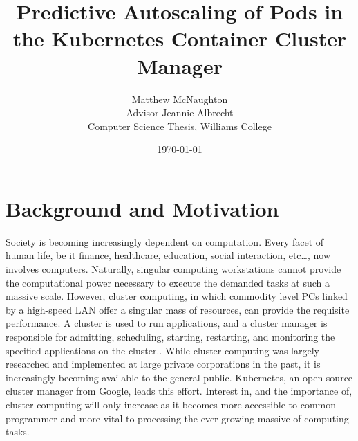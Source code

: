 \documentclass[letterpaper,11pt,twocolumn]{article}
\begin{document}
\title{Predictive Autoscaling of Pods in the Kubernetes Container Cluster
Manager}
\date{\today}

\author{
  {\rm Matthew McNaughton}\\
  Advisor Jeannie Albrecht\\
  Computer Science Thesis, Williams College
}

\maketitle

\thispagestyle{empty}

\section{Background and Motivation}
Society is becoming increasingly dependent on computation. Every facet of human
life, be it finance, healthcare, education, social interaction, etc\ldots, now
involves computers.\cite[pg. 4]{distributed-systems-concepts-and-design}
Naturally, singular computing workstations cannot provide the computational
power necessary to execute the demanded tasks at such a massive scale.\cite[pg.
2]{distributed-systems-principles-and-paradigms} However, cluster computing,
in which commodity level PCs linked by a
high-speed LAN offer a singular mass of resources,
can provide the requisite performance.\cite[pg.
17]{distributed-systems-principles-and-paradigms}
A cluster is used to run applications, and a cluster manager is responsible for
admitting, scheduling, starting, restarting, and monitoring the specified
applications on the cluster.\cite[pg. 1]{borg}. While cluster computing was largely
researched and implemented at large private corporations in the past, it is
increasingly becoming available to the general public. Kubernetes, an open
source cluster manager from Google, leads this effort.\cite{k8s-website}
Interest in, and the importance of, cluster computing will only increase as it
becomes more accessible to common programmer and more vital to processing the ever
growing massive of computing tasks.
\end{document}
